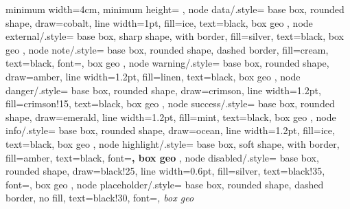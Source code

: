 {{		minimum width=4cm,
		minimum height=
	},
	node data/.style={
		base box, rounded shape,
		draw=cobalt, line width=1pt,
		fill=ice, text=black, box geo
	},
	node external/.style={
		base box, sharp shape, with border,
		fill=silver, text=black, box geo
	},
	node note/.style={
		base box, rounded shape, dashed border,
		fill=cream, text=black,
		font=\small\sffamily, box  geo
	},
	node warning/.style={
		base box, rounded shape,
		draw=amber, line width=1.2pt,
		fill=linen, text=black, box geo
	},
	node danger/.style={
		base box, rounded shape,
		draw=crimson, line width=1.2pt,
		fill=crimson!15, text=black, box geo
	},
	node success/.style={
		base box, rounded shape,
		draw=emerald, line width=1.2pt,
		fill=mint, text=black, box geo
	},
	node info/.style={
		base box, rounded shape,
		draw=ocean, line width=1.2pt,
		fill=ice, text=black, box geo
	},
	node highlight/.style={
		base box, soft shape, with border,
		fill=amber, text=black,
		font=\large\sffamily\bfseries, box geo
	},
	node disabled/.style={
		base box, rounded shape,
		draw=black!25, line width=0.6pt,
		fill=silver, text=black!35,
		font=\normalsize\sffamily, box geo
	},
	node placeholder/.style={
		base box, rounded shape, dashed border,
		no fill, text=black!30,
		font=\small\sffamily\itshape, box geo
	}
}